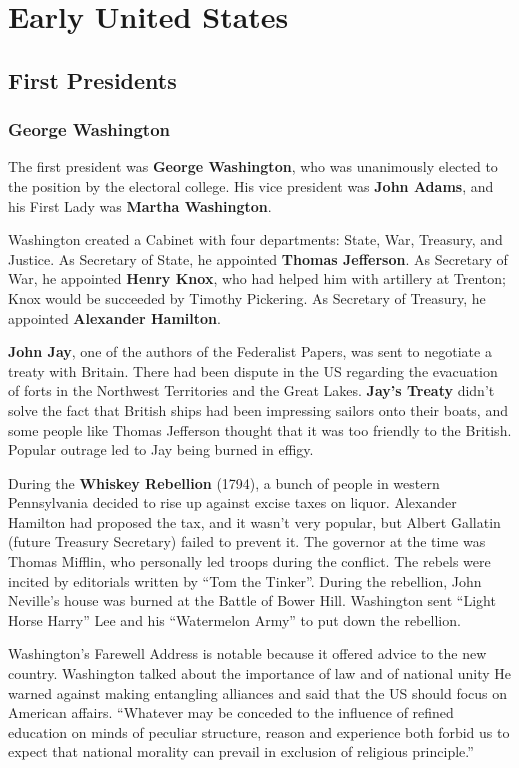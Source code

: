\chapter{Early United States}

\section{First Presidents}

\subsection*{George Washington}

The first president was \textbf{George Washington},
who was unanimously elected to the position by the electoral college.
His vice president was \textbf{John Adams},
and his First Lady was \textbf{Martha Washington}.

Washington created a Cabinet with four departments: State, War, Treasury, and Justice.
As Secretary of State, he appointed \textbf{Thomas Jefferson}.
As Secretary of War, he appointed \textbf{Henry Knox},
who had helped him with artillery at Trenton;
Knox would be succeeded by Timothy Pickering.
As Secretary of Treasury, he appointed \textbf{Alexander Hamilton}.

\textbf{John Jay}, one of the authors of the Federalist Papers, was sent to negotiate a treaty with Britain.
There had been dispute in the US regarding the evacuation of forts in the Northwest Territories and the Great Lakes.
\textbf{Jay's Treaty} didn't solve the fact that British ships had been impressing sailors onto their boats,
and some people like Thomas Jefferson thought that it was too friendly to the British.
Popular outrage led to Jay being burned in effigy.

During the \textbf{Whiskey Rebellion} (1794),
a bunch of people in western Pennsylvania decided to rise up against excise taxes on liquor.
Alexander Hamilton had proposed the tax, and it wasn't very popular,
but Albert Gallatin (future Treasury Secretary) failed to prevent it.
The governor at the time was Thomas Mifflin, who personally led troops during the conflict.
The rebels were incited by editorials written by ``Tom the Tinker''.
During the rebellion, John Neville's house was burned at the Battle of Bower Hill.
Washington sent ``Light Horse Harry'' Lee and his ``Watermelon Army'' to put down the rebellion.

Washington's Farewell Address is notable because it offered advice to the new country.
Washington talked about the importance of law and of national unity
He warned against making entangling alliances and said that the US should focus on American affairs.
``Whatever may be conceded to the influence of refined education on minds of peculiar structure,
reason and experience both forbid us to expect that national morality
can prevail in exclusion of religious principle.''

